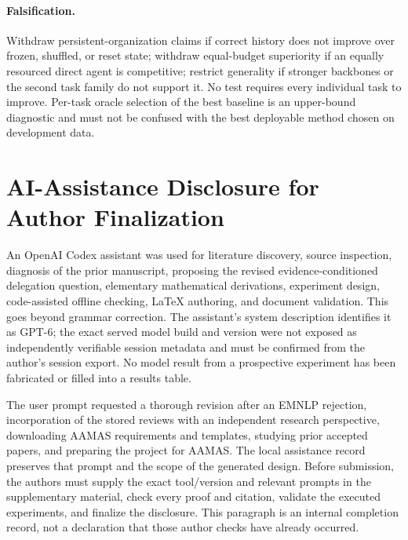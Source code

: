\documentclass[sigconf,anonymous]{aamas}
\begin{document}
\paragraph{Falsification.}
Withdraw persistent-organization claims if correct history does not improve over frozen, shuffled, or reset state; withdraw equal-budget superiority if an equally resourced direct agent is competitive; restrict generality if stronger backbones or the second task family do not support it. No test requires every individual task to improve. Per-task oracle selection of the best baseline is an upper-bound diagnostic and must not be confused with the best deployable method chosen on development data.

\section{AI-Assistance Disclosure for Author Finalization}

An OpenAI Codex assistant was used for literature discovery, source inspection, diagnosis of the prior manuscript, proposing the revised evidence-conditioned delegation question, elementary mathematical derivations, experiment design, code-assisted offline checking, LaTeX authoring, and document validation. This goes beyond grammar correction. The assistant's system description identifies it as GPT-6; the exact served model build and version were not exposed as independently verifiable session metadata and must be confirmed from the author's session export. No model result from a prospective experiment has been fabricated or filled into a results table.

The user prompt requested a thorough revision after an EMNLP rejection, incorporation of the stored reviews with an independent research perspective, downloading AAMAS requirements and templates, studying prior accepted papers, and preparing the project for AAMAS. The local assistance record preserves that prompt and the scope of the generated design. Before submission, the authors must supply the exact tool/version and relevant prompts in the supplementary material, check every proof and citation, validate the executed experiments, and finalize the disclosure. This paragraph is an internal completion record, not a declaration that those author checks have already occurred.
\end{document}
